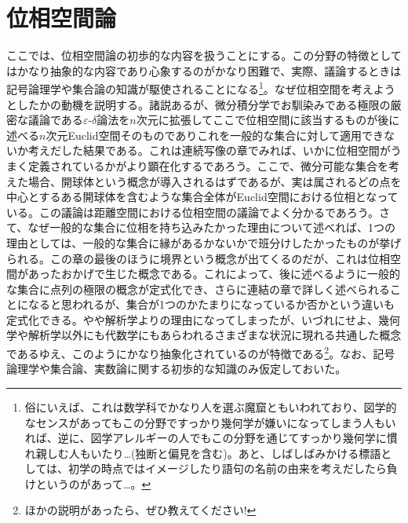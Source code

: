 \documentclass[a4paper]{jsarticle}
\begin{document}
\section{位相空間論}
ここでは、位相空間論の初歩的な内容を扱うことにする。この分野の特徴としてはかなり抽象的な内容であり心象するのがかなり困難で、実際、議論するときは記号論理学や集合論の知識が駆使されることになる\footnote{俗にいえば、これは数学科でかなり人を選ぶ魔窟ともいわれており、図学的なセンスがあってもこの分野ですっかり幾何学が嫌いになってしまう人もいれば、逆に、図学アレルギーの人でもこの分野を通じてすっかり幾何学に慣れ親しむ人もいたり…(独断と偏見を含む)。あと、しばしばみかける標語としては、初学の時点ではイメージしたり語句の名前の由来を考えだしたら負けというのがあって…。}。なぜ位相空間を考えようとしたかの動機を説明する。諸説あるが、微分積分学でお馴染みである極限の厳密な議論である$\varepsilon$-$\delta$論法を$n$次元に拡張してここで位相空間に該当するものが後に述べる$n$次元Euclid空間そのものでありこれを一般的な集合に対して適用できないか考えだした結果である。これは連続写像の章でみれば、いかに位相空間がうまく定義されているかがより顕在化するであろう。ここで、微分可能な集合を考えた場合、開球体という概念が導入されるはずであるが、実は属されるどの点を中心とするある開球体を含むような集合全体がEuclid空間における位相となっている。この議論は距離空間における位相空間の議論でよく分かるであろう。さて、なぜ一般的な集合に位相を持ち込みたかった理由について述べれば、1つの理由としては、一般的な集合に縁があるかないかで班分けしたかったものが挙げられる。この章の最後のほうに境界という概念が出てくるのだが、これは位相空間があったおかげで生じた概念である。これによって、後に述べるように一般的な集合に点列の極限の概念が定式化でき、さらに連結の章で詳しく述べられることになると思われるが、集合が1つのかたまりになっているか否かという違いも定式化できる。やや解析学よりの理由になってしまったが、いづれにせよ、幾何学や解析学以外にも代数学にもあらわれるさまざまな状況に現れる共通した概念であるゆえ、このようにかなり抽象化されているのが特徴である\footnote{ほかの説明があったら、ぜひ教えてください!}。なお、記号論理学や集合論、実数論に関する初歩的な知識のみ仮定しておいた。
\end{document}
